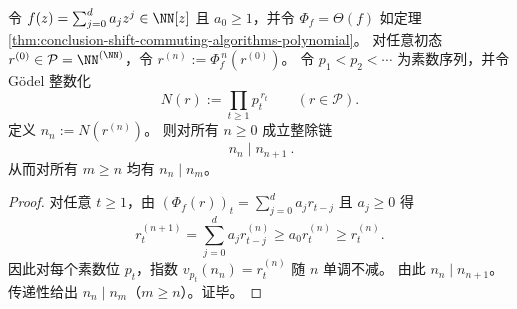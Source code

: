 \begin{proposition}\label{prop:conclusion-godel-divisibility-tower}
令 \(f(z)=\sum_{j=0}^{d}a_j z^j\in\NN[z]\) 且 \(a_0\ge 1\)，并令 \(\Phi_f=\Theta(f)\) 如定理 \ref{thm:conclusion-shift-commuting-algorithms-polynomial}。
对任意初态 \(r^{(0)}\in\mathcal P=\NN^{(\NN)}\)，令 \(r^{(n)}:=\Phi_f^{\,n}(r^{(0)})\)。
令 \(p_1<p_2<\cdots\) 为素数序列，并令 Gödel 整数化
\[
N(r):=\prod_{t\ge 1}p_t^{\,r_t}\qquad(r\in\mathcal P).
\]
定义 \(n_n:=N(r^{(n)})\)。
则对所有 \(n\ge 0\) 成立整除链
\[
\boxed{\ n_n\mid n_{n+1}\ }.
\]
从而对所有 \(m\ge n\) 均有 \(n_n\mid n_m\)。
\end{proposition}
\begin{proof}
对任意 \(t\ge 1\)，由 \((\Phi_f(r))_t=\sum_{j=0}^d a_j r_{t-j}\) 且 \(a_j\ge 0\) 得
\[
r^{(n+1)}_t
=\sum_{j=0}^d a_j r^{(n)}_{t-j}
\ge a_0 r^{(n)}_t
\ge r^{(n)}_t.
\]
因此对每个素数位 \(p_t\)，指数 \(v_{p_t}(n_n)=r^{(n)}_t\) 随 \(n\) 单调不减。
由此 \(n_n\mid n_{n+1}\)。
传递性给出 \(n_n\mid n_m\)（\(m\ge n\)）。证毕。
\end{proof}

\endinput
